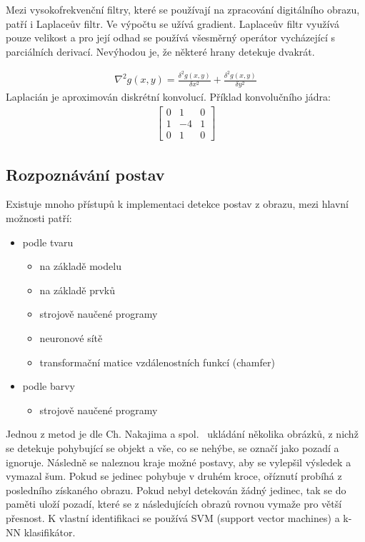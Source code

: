 Mezi vysokofrekvenční filtry, které se používají na zpracování digitálního obrazu, patří i Laplaceův filtr. Ve výpočtu se užívá gradient. Laplaceův filtr využívá pouze velikost a pro její odhad se používá všesměrný operátor vycházející s parciálních derivací. Nevýhodou je, že některé hrany detekuje dvakrát. %

\begin{eqnarray}
\nabla^{2}g(x,y) = \frac{\delta^{2}g(x,y)}{\delta x^{2}} + \frac{\delta^{2}g(x,y)}{\delta y^{2}}
\end{eqnarray} 
Laplacián je aproximován diskrétní konvolucí. Příklad konvolučního jádra:
\begin{eqnarray}
\begin{bmatrix}
0 & 1 & 0 \\
1 & -4 & 1 \\
0 & 1 & 0
\end{bmatrix}
\end{eqnarray} 


\subsection{Rozpoznávání postav}
Existuje mnoho přístupů k implementaci detekce postav z obrazu, mezi hlavní možnosti patří:
\begin{itemize}


\item podle tvaru
\begin{itemize}
\item na základě modelu
\item na základě prvků
\item strojově naučené programy
\item neuronové sítě %
\item transformační matice vzdálenostních funkcí (chamfer)
\end{itemize}
\item podle barvy
\begin{itemize}
\item strojově naučené programy\\
\end{itemize}
\end{itemize}

Jednou z metod je dle Ch. Nakajima a spol.~\cite{6} ukládání několika obrázků, z nichž se detekuje pohybující se objekt a vše, co se nehýbe, se označí jako pozadí a ignoruje. Následně se naleznou kraje možné postavy, aby se vylepšil výsledek a vymazal šum. Pokud se jedinec pohybuje v druhém kroce, oříznutí probíhá z posledního získaného obrazu. Pokud nebyl detekován žádný jedinec, tak se do paměti uloží pozadí, které se z následujících obrazů rovnou vymaže pro větší přesnost. K vlastní identifikaci se používá SVM (support vector machines) a k-NN klasifikátor.\\

